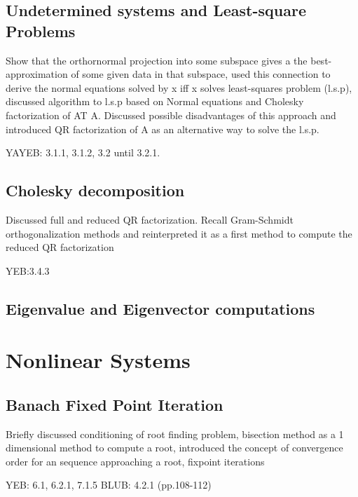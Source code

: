 \documentclass{article}
\theoremstyle{remark}
\begin{document}
\subsection{Undetermined systems and Least-square Problems}%
\label{sub:undetermined_systems_and_least_square_problems}
\begin{tcolorbox}
  Show that the orthornormal projection into some subspace gives a the best-approximation of some given data in that subspace, used this connection to derive the normal equations solved by x iff x solves least-squares problem (l.s.p), discussed algorithm to l.s.p based on Normal equations and Cholesky factorization of AT A. Discussed possible disadvantages of this approach and introduced QR factorization of A as an alternative way to solve the l.s.p.	
  \par
  YAYEB: 3.1.1, 3.1.2, 3.2 until 3.2.1.

\end{tcolorbox}


\subsection{Cholesky decomposition}%
\label{sub:chelesky_decomposition}
\begin{tcolorbox}
  Discussed full and reduced QR factorization. Recall Gram-Schmidt orthogonalization methods and reinterpreted it as a first method to compute the reduced QR factorization	
  \par
  YEB:3.4.3
\end{tcolorbox}

\subsection{Eigenvalue and Eigenvector computations}%
\label{sub:eigenvalue_and_eigenvector_computations}

\newpage
\section{Nonlinear Systems}%
\label{sec:nonlinear_systems}

\subsection{Banach Fixed Point Iteration}%
\label{sub:banach_fixed_point_iteration}
\begin{tcolorbox}
  Briefly discussed conditioning of root finding problem, bisection method as a 1 dimensional method to compute a root, introduced the concept of convergence order for an sequence approaching a root, fixpoint iterations
  \par
  YEB: 6.1, 6.2.1, 7.1.5
  BLUB: 4.2.1 (pp.108-112)
\end{tcolorbox}
\end{document}
